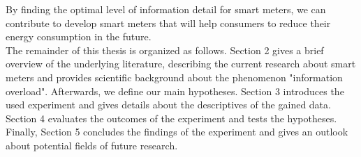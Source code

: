 By finding the optimal level of information detail for smart meters, we can contribute to develop smart meters that will help consumers to reduce their energy consumption in the future.\\ 
The remainder of this thesis is organized as follows. Section 2 gives a brief overview of the underlying literature, describing the current research about smart meters and provides scientific background about the phenomenon "information overload". Afterwards, we define our main hypotheses.
Section 3 introduces the used experiment and gives details about the descriptives of the gained data. Section 4 evaluates the outcomes of the experiment and tests the hypotheses. Finally, Section 5 concludes the findings of the experiment and gives an outlook about potential fields of future research.